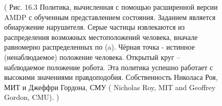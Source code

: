 \documentclass[10pt,a4paper]{article}
\begin{document}
\begin{figure}[H]
	\caption{ ( Рис. 16.3 Политика, вычисленная с помощью расширенной версии AMDP с обученным представлением состояния. Заданием является обнаружение нарушителя. Серые частицы извлекаются из распределения возможных местоположений человека, вначале равномерно распределенных по (a). Чёрная точка - истинное (ненаблюдаемое) положение человека. Открытый круг – наблюдаемое положение робота. Эта политика успешно работает  с высокими значениями правдоподобия. Собственность Николаса Роя, МИТ и Джеффри Гордона, СМУ ( Nicholas Roy, MIT and Geoffrey Gordon, CMU). ) }
	\label{fig:163orig}
\end{figure}
\end{document}
